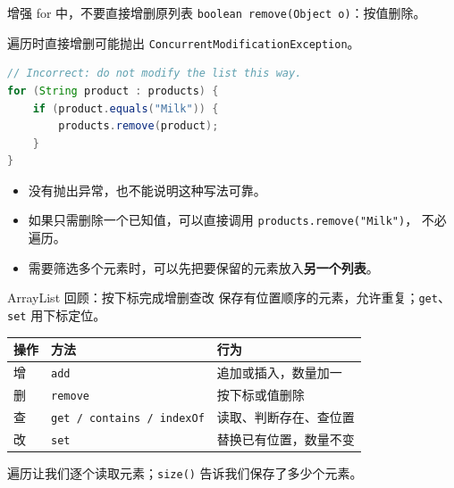 \documentclass[aspectratio=169]{beamer}
\begin{document}
\begin{frame}[fragile]{增强 for 中，不要直接增删原列表}
  \texttt{boolean remove(Object o)}：按值删除。
  \par
  遍历时直接增删可能抛出 \texttt{ConcurrentModificationException}。
  \begin{lstlisting}[language=Java]
// Incorrect: do not modify the list this way.
for (String product : products) {
    if (product.equals("Milk")) {
        products.remove(product);
    }
}
  \end{lstlisting}
  \begin{itemize}
    \item 没有抛出异常，也不能说明这种写法可靠。
    \item 如果只需删除一个已知值，可以\alert{直接调用} \texttt{products.remove("Milk")}，
      不必遍历。
    \item 需要筛选多个元素时，可以先把要保留的元素放入\textbf{另一个列表}。
  \end{itemize}
\end{frame}

\begin{frame}{ArrayList 回顾：按下标完成增删查改}
  保存有位置顺序的元素，允许重复；\texttt{get}、\texttt{set} 用下标定位。
  \par\bigskip
  \begin{center}
    \renewcommand{\arraystretch}{1.4}
    \begin{tabular}{lll}
      \textbf{操作} & \textbf{方法} & \textbf{行为} \\
      \hline
      增 & \texttt{add} & 追加或插入，数量加一 \\
      删 & \texttt{remove} & 按下标或值删除 \\
      查 & \texttt{get / contains / indexOf} & 读取、判断存在、查位置 \\
      改 & \texttt{set} & 替换已有位置，数量不变 \\
    \end{tabular}
  \end{center}
  \bigskip
  遍历让我们逐个读取元素；\texttt{size()} 告诉我们保存了多少个元素。
\end{frame}
\end{document}
